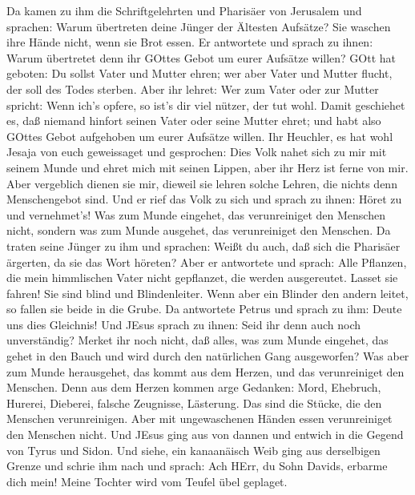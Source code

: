  Da kamen zu ihm die Schriftgelehrten und Pharisäer von
Jerusalem und sprachen:  Warum übertreten deine Jünger der
Ältesten Aufsätze? Sie waschen ihre Hände nicht, wenn sie Brot essen.
 Er antwortete und sprach zu ihnen: Warum übertretet denn
ihr GOttes Gebot um eurer Aufsätze willen?  GOtt hat
geboten: Du sollst Vater und Mutter ehren; wer aber Vater und Mutter
flucht, der soll des Todes sterben.  Aber ihr lehret: Wer
zum Vater oder zur Mutter spricht: Wenn ich's opfere, so ist's dir viel
nützer, der tut wohl.  Damit geschiehet es, daß niemand
hinfort seinen Vater oder seine Mutter ehret; und habt also GOttes Gebot
aufgehoben um eurer Aufsätze willen.  Ihr Heuchler, es hat
wohl Jesaja von euch geweissaget und gesprochen:  Dies Volk
nahet sich zu mir mit seinem Munde und ehret mich mit seinen Lippen,
aber ihr Herz ist ferne von mir.  Aber vergeblich dienen sie
mir, dieweil sie lehren solche Lehren, die nichts denn Menschengebot
sind.  Und er rief das Volk zu sich und sprach zu ihnen:
Höret zu und vernehmet's!  Was zum Munde eingehet, das
verunreiniget den Menschen nicht, sondern was zum Munde ausgehet, das
verunreiniget den Menschen.  Da traten seine Jünger zu ihm
und sprachen: Weißt du auch, daß sich die Pharisäer ärgerten, da sie das
Wort höreten?  Aber er antwortete und sprach: Alle
Pflanzen, die mein himmlischen Vater nicht gepflanzet, die werden
ausgereutet.  Lasset sie fahren! Sie sind blind und
Blindenleiter. Wenn aber ein Blinder den andern leitet, so fallen sie
beide in die Grube.  Da antwortete Petrus und sprach zu
ihm: Deute uns dies Gleichnis!  Und JEsus sprach zu ihnen:
Seid ihr denn auch noch unverständig?  Merket ihr noch
nicht, daß alles, was zum Munde eingehet, das gehet in den Bauch und
wird durch den natürlichen Gang ausgeworfen?  Was aber zum
Munde herausgehet, das kommt aus dem Herzen, und das verunreiniget den
Menschen.  Denn aus dem Herzen kommen arge Gedanken: Mord,
Ehebruch, Hurerei, Dieberei, falsche Zeugnisse, Lästerung. 
Das sind die Stücke, die den Menschen verunreinigen. Aber mit
ungewaschenen Händen essen verunreiniget den Menschen nicht.
 Und JEsus ging aus von dannen und entwich in die Gegend
von Tyrus und Sidon.  Und siehe, ein kanaanäisch Weib ging
aus derselbigen Grenze und schrie ihm nach und sprach: Ach HErr, du Sohn
Davids, erbarme dich mein! Meine Tochter wird vom Teufel übel geplaget.

